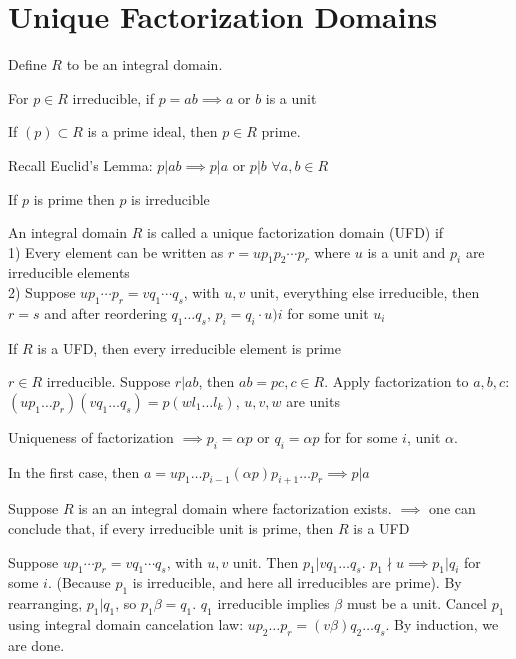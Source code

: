 \documentclass[10pt]{article}
\begin{document}
\section{Unique Factorization Domains}
Define $R$ to be an integral domain. 
\begin{defn}
    For $p \in R$ irreducible, if $p = ab \implies a$ or $b$ is a unit
\end{defn}

\begin{defn}
    If $(p) \subset R$ is a prime ideal, then $p\in R$ prime.
\end{defn}
Recall Euclid's Lemma: $p | ab \implies p | a$ or $p | b$ $\forall a, b \in R$

\begin{rmk}
    If $p$ is prime then $p$ is irreducible
\end{rmk}

\begin{defn}
    An integral domain $R$ is called a unique factorization domain (UFD) if\\
    1) Every element can be written as $r = up_1p_2\cdots p_r$ where $u$ is a unit and $p_i$ are irreducible elements\\
    2) Suppose $up_1\cdots p_r = vq_1 \cdots q_s$, with $u, v$ unit, everything else irreducible, then $r = s$ and after reordering $q_1\ldots q_s$, $p_i = q_i \cdot u)i$ for some unit $u_i$
\end{defn}

\begin{rmk}
    If $R$ is a UFD, then every irreducible element is prime
\end{rmk}
$r \in R$ irreducible. Suppose $r | ab$, then $ab = pc, c\in R$. Apply factorization to $a, b, c$: $(u p_1\ldots p_r)(vq_1\ldots q_s) = p(wl_1 \ldots l_k)$, $u, v, w$ are units

Uniqueness of factorization $\implies p_i = \alpha p$ or $q_i = \alpha p$ for for some $i$, unit $\alpha$. 

In the first case, then $a = up_1 \ldots p_{i-1}(\alpha p)p_{i + 1}\ldots p_r \implies p | a$

\begin{rmk} 
    Suppose $R$ is an an integral domain where factorization exists. $\implies$ one can conclude that, if every irreducible unit is prime, then $R$ is a UFD
\end{rmk}
Suppose $up_1\cdots p_r = vq_1 \cdots q_s$, with $u, v$ unit. Then $p_1 | vq_1\ldots q_s$. $p_1 \nmid u \implies p_1 | q_i$ for some $i$. (Because $p_1$ is irreducible, and here all irreducibles are prime). By rearranging, $p_1 | q_1$, so $p_1 \beta = q_1$. $q_1$ irreducible implies $\beta$ must be a unit. Cancel $p_1$ using integral domain cancelation law: $up_2\ldots p_r = (v\beta)q_2\ldots q_s$. By induction, we are done.
\end{document}
